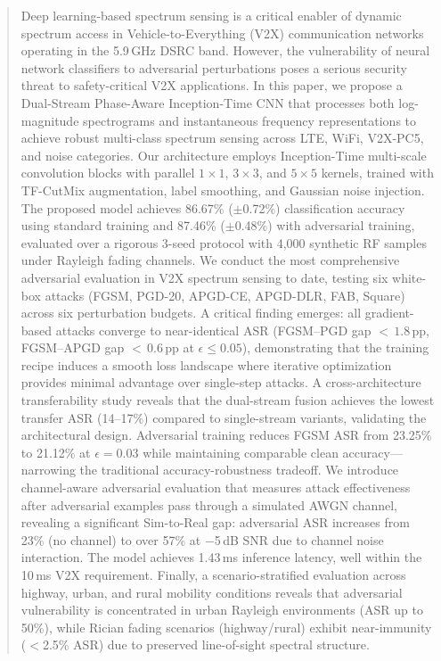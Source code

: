 \documentclass[conference]{IEEEtran}
\begin{document}
\begin{abstract}
Deep learning-based spectrum sensing is a critical enabler of dynamic spectrum access in Vehicle-to-Everything (V2X) communication networks operating in the 5.9\,GHz DSRC band. However, the vulnerability of neural network classifiers to adversarial perturbations poses a serious security threat to safety-critical V2X applications. In this paper, we propose a Dual-Stream Phase-Aware Inception-Time CNN that processes both log-magnitude spectrograms and instantaneous frequency representations to achieve robust multi-class spectrum sensing across LTE, WiFi, V2X-PC5, and noise categories. Our architecture employs Inception-Time multi-scale convolution blocks with parallel $1{\times}1$, $3{\times}3$, and $5{\times}5$ kernels, trained with TF-CutMix augmentation, label smoothing, and Gaussian noise injection. The proposed model achieves 86.67\% ($\pm$0.72\%) classification accuracy using standard training and 87.46\% ($\pm$0.48\%) with adversarial training, evaluated over a rigorous 3-seed protocol with 4,000 synthetic RF samples under Rayleigh fading channels. We conduct the most comprehensive adversarial evaluation in V2X spectrum sensing to date, testing six white-box attacks (FGSM, PGD-20, APGD-CE, APGD-DLR, FAB, Square) across six perturbation budgets. A critical finding emerges: all gradient-based attacks converge to near-identical ASR (FGSM--PGD gap ${<}\,1.8$\,pp, FGSM--APGD gap ${<}\,0.6$\,pp at $\epsilon \leq 0.05$), demonstrating that the training recipe induces a smooth loss landscape where iterative optimization provides minimal advantage over single-step attacks. A cross-architecture transferability study reveals that the dual-stream fusion achieves the lowest transfer ASR (14--17\%) compared to single-stream variants, validating the architectural design. Adversarial training reduces FGSM ASR from 23.25\% to 21.12\% at $\epsilon=0.03$ while maintaining comparable clean accuracy---narrowing the traditional accuracy-robustness tradeoff. We introduce channel-aware adversarial evaluation that measures attack effectiveness after adversarial examples pass through a simulated AWGN channel, revealing a significant Sim-to-Real gap: adversarial ASR increases from 23\% (no channel) to over 57\% at $-$5\,dB SNR due to channel noise interaction. The model achieves 1.43\,ms inference latency, well within the 10\,ms V2X requirement. Finally, a scenario-stratified evaluation across highway, urban, and rural mobility conditions reveals that adversarial vulnerability is concentrated in urban Rayleigh environments (ASR up to 50\%), while Rician fading scenarios (highway/rural) exhibit near-immunity ($<$2.5\% ASR) due to preserved line-of-sight spectral structure.
\end{abstract}
\end{document}
